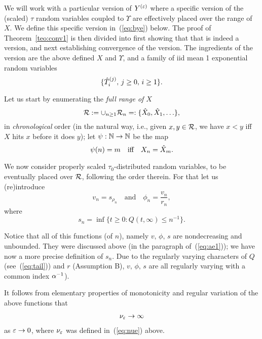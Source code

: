 We will work with a particular version of $Y^{(\varepsilon)}$ where a specific version of the (scaled) $\tau$ random variables coupled to $\Upsilon$ are
effectively placed over the range of $X$.
We define this specific version in~(\ref{eq:bye}) below. The proof of Theorem~\ref{teo:conv1} is then divided into first showing that that is
indeed a version, and next establishing convergence of the version.
The ingredients of the version are the above defined $X$ and $\Upsilon$, and a family of iid mean 1 exponential random variables
\begin{equation}
 \{\hat T^{(j)}_i,\,j\geq0,\,i\geq1\}.
\end{equation}


Let us start by enumerating the {\em full range of $X$}
\begin{equation}\label{eq:enum}
 \RR:=\cup_{n\geq1}\RR_n=:\{\txt_0,\txt_1,\ldots\},
\end{equation} 
in {\em chronological} order (in the natural way, i.e., given $x,y\in{\cal R}$, we have $x<y$ iff $X$ hits $x$ before it does $y$);
let $\psi:{\mathbb N}\to{\mathbb N}$ be the map
\begin{equation}
\label{eq:phi}
\psi(n)=m\quad\mbox{iff}\quad X_n=\txt_m.
\end{equation}

We now consider properly scaled $\tau_0$-distributed random variables, to be eventually placed over ${\cal R}$, following the order therein.
For that let us (re)introduce
\begin{equation}
  \label{eq:vnu}
v_n=s_{\rho_n}\quad\mbox{and}\quad \phi_n=\frac{v_n}{r_n},
\end{equation}
where
\begin{equation}
  \label{eq:sn}
  s_n=\inf\{t\geq0:Q(t,\infty)\leq n^{-1}\}.%
\end{equation}


Notice that all of this functions (of $n$), namely $v,\,\phi,\,s$ are nondecreasing and unbounded. %
They were discussed above (in the paragraph of~(\ref{eq:ae1})); we have now a more precise definition of $s_n$. 
Due to the regularly varying characters of $Q$ (see~(\ref{eq:tail})) and $r$ (Assumption B), $v,\,\phi,\,s$ 
are all regularly varying with a common index $\alpha^{-1}$).






It follows from elementary properties of monotonicity and regular variation of the above functions that
\begin{eqnarray}
  \label{eq:nuinf}
\nu_\eps\to\infty%
\end{eqnarray}
as $\varepsilon\to0$, where $\nu_\varepsilon$ was defined in~(\ref{eq:nue}) above.



